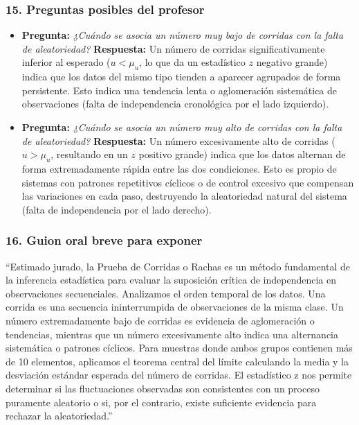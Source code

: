 \documentclass[11pt,a4paper]{article}
\begin{document}
\subsubsection{15. Preguntas posibles del profesor}
\begin{itemize}
    \item \textbf{Pregunta:} \textit{¿Cuándo se asocia un número muy bajo de corridas con la falta de aleatoriedad?}
    \textbf{Respuesta:} Un número de corridas significativamente inferior al esperado ($u < \mu_u$, lo que da un estadístico $z$ negativo grande) indica que los datos del mismo tipo tienden a aparecer agrupados de forma persistente. Esto indica una tendencia lenta o aglomeración sistemática de observaciones (falta de independencia cronológica por el lado izquierdo).
    \item \textbf{Pregunta:} \textit{¿Cuándo se asocia un número muy alto de corridas con la falta de aleatoriedad?}
    \textbf{Respuesta:} Un número excesivamente alto de corridas ($u > \mu_u$, resultando en un $z$ positivo grande) indica que los datos alternan de forma extremadamente rápida entre las dos condiciones. Esto es propio de sistemas con patrones repetitivos cíclicos o de control excesivo que compensan las variaciones en cada paso, destruyendo la aleatoriedad natural del sistema (falta de independencia por el lado derecho).
\end{itemize}

\subsubsection{16. Guion oral breve para exponer}
\begin{guion}
    ``Estimado jurado, la Prueba de Corridas o Rachas es un método fundamental de la inferencia estadística para evaluar la suposición crítica de independencia en observaciones secuenciales. Analizamos el orden temporal de los datos. Una corrida es una secuencia ininterrumpida de observaciones de la misma clase. Un número extremadamente bajo de corridas es evidencia de aglomeración o tendencias, mientras que un número excesivamente alto indica una alternancia sistemática o patrones cíclicos. Para muestras donde ambos grupos contienen más de 10 elementos, aplicamos el teorema central del límite calculando la media y la desviación estándar esperada del número de corridas. El estadístico z nos permite determinar si las fluctuaciones observadas son consistentes con un proceso puramente aleatorio o si, por el contrario, existe suficiente evidencia para rechazar la aleatoriedad.''
\end{guion}
\end{document}
